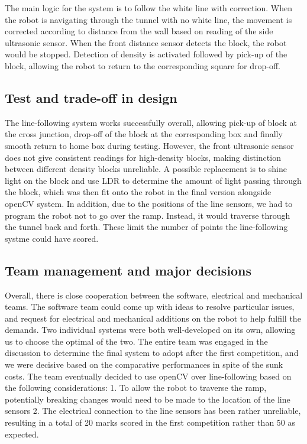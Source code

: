 \documentclass{article}
\begin{document}
The main logic for the system is to follow the white line with correction. When the robot is navigating through the tunnel with no white line, the movement is corrected according to distance from the wall based on reading of the side ultrasonic sensor.
When the front distance sensor detects the block, the robot would be stopped. Detection of density is activated followed by pick-up of the block, allowing the robot to return to the corresponding square for drop-off. 

\subsection{Test and trade-off in design}
The line-following system works successfully overall, allowing pick-up of block at the cross junction, drop-off of the block at the corresponding box and finally smooth return to home box during testing. However, the front ultrasonic sensor does not give consistent readings for high-density blocks, making distinction between different density blocks unreliable. A possible replacement is to shine light on the block and use LDR to determine the amount of light passing through the block, which was then fit onto the robot in the final version alongside openCV system. In addition, due to the positions of the line sensors, we had to program the robot not to go over the ramp. Instead, it would traverse through the tunnel back and forth. These limit the number of points the line-following systme could have scored. 

\subsection{Team management and major decisions}
Overall, there is close cooperation between the software, electrical and mechanical teams. The software team could come up with ideas to resolve particular issues, and request for electrical and mechanical additions on the robot to help fulfill the demands. Two individual systems were both well-developed on its own, allowing us to choose the optimal of the two. The entire team was engaged in the discussion to determine the final system to adopt after the first competition, and we were decisive based on the comparative performances in spite of the sunk costs.
The team eventually decided to use openCV over line-following based on the following considerations: 
1. To allow the robot to traverse the ramp, potentially breaking changes would need to be made to the location of the line sensors
2. The electrical connection to the line sensors has been rather unreliable, resulting in a total of 20 marks scored in the first competition rather than 50 as expected.
\end{document}
